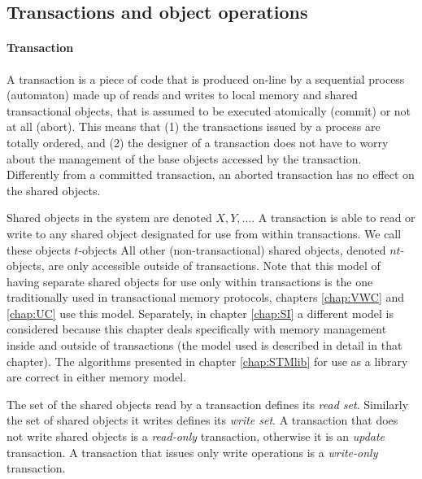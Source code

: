 \subsection{Transactions and object operations}
\label{base-definitions}

\paragraph{Transaction}
A transaction is  a piece of code that is produced  on-line by a sequential
process (automaton)
made up of reads and writes to local memory and shared transactional objects,
that is assumed to be executed  atomically (commit) or
not  at all  (abort). This  means  that (1)  the transactions  issued by  a
process are totally ordered, and (2) the designer of a transaction does 
not have to  worry about the  management of the  base objects  accessed  
by the transaction.  Differently from  a committed transaction, an aborted  
transaction has no effect on the shared objects.

Shared objects in the system are  denoted $X,Y,\ldots$.
A transaction is able to read or write to any shared object designated
for use from within transactions.
We call these objects $t$-objects
All other (non-transactional) shared objects, denoted $nt$-objects,
are only accessible outside of transactions.
Note that this model of having separate shared objects for use only within transactions
is the one traditionally used in transactional memory
protocols, chapters \ref{chap:VWC} and \ref{chap:UC} use this model.
Separately, in chapter \ref{chap:SI} a different model is considered
because this chapter deals specifically with memory management
inside and outside of transactions (the model used is described in detail in that chapter).
The algorithms presented in chapter \ref{chap:STMlib} for use as a library are correct in either memory model.

The set of the shared objects read by a transaction  defines its
{\it read  set}.  Similarly the set  of shared objects it writes  defines its 
{\it write set}. A transaction that does not  write shared objects is 
a  {\it  read-only}  transaction, otherwise it is an {\it update}
transaction.  A transaction that issues only write operations is 
a {\it write-only}  transaction. 

